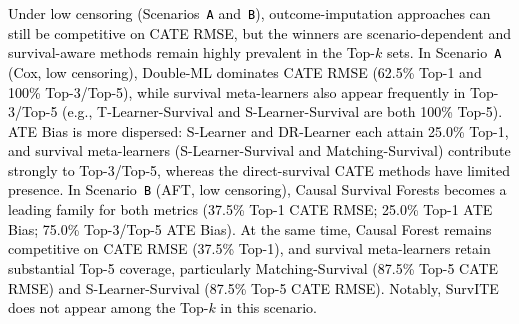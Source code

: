 \documentclass{article} %
\newcommand{\rebuttal}[1]{\textcolor{black}{#1}}
\begin{document}
\rebuttal{Under low censoring (Scenarios~\texttt{A} and~\texttt{B}), outcome-imputation approaches can still be competitive on CATE RMSE, but the winners are scenario-dependent and survival-aware methods remain highly prevalent in the Top-$k$ sets. In Scenario~\texttt{A} (Cox, low censoring), Double-ML dominates CATE RMSE (62.5\% Top-1 and 100\% Top-3/Top-5), while survival meta-learners also appear frequently in Top-3/Top-5 (e.g., T-Learner-Survival and S-Learner-Survival are both 100\% Top-5). ATE Bias is more dispersed: S-Learner and DR-Learner each attain 25.0\% Top-1, and survival meta-learners (S-Learner-Survival and Matching-Survival) contribute strongly to Top-3/Top-5, whereas the direct-survival CATE methods have limited presence. In Scenario~\texttt{B} (AFT, low censoring), Causal Survival Forests becomes a leading family for both metrics (37.5\% Top-1 CATE RMSE; 25.0\% Top-1 ATE Bias; 75.0\% Top-3/Top-5 ATE Bias). At the same time, Causal Forest remains competitive on CATE RMSE (37.5\% Top-1), and survival meta-learners retain substantial Top-5 coverage, particularly Matching-Survival (87.5\% Top-5 CATE RMSE) and S-Learner-Survival (87.5\% Top-5 CATE RMSE). Notably, SurvITE does not appear among the Top-$k$ in this scenario.}
\end{document}
